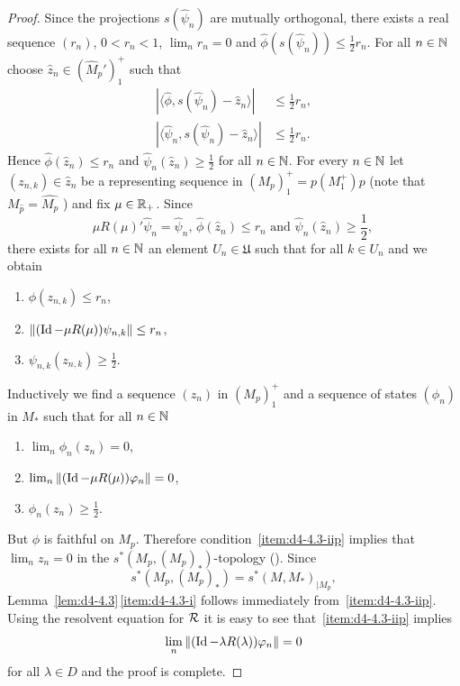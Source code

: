 \begin{proof}
Since the projections $ s(\widehat{\psi}_{n}) $  are mutually orthogonal, there exists a real sequence $ (r_{n}) $, $ 0 < r_{n} < 1 $, $ \lim_{n} r_{n} = 0 $  and $ \widehat{\phi}(s(\widehat{\psi}_{n})) \leq \frac{1}{2}r_{n} $.
For all $ n \in \mathbb{N} $  choose $ \hat{z}_{n} \in (\widehat{M}_{p}')_{1}^{+} $  such that
\begin{align*}
|\langle\widehat{\phi},s(\widehat{\psi}_{n}) - \hat{z}_{n}\rangle| &\leq \frac{1}{2}r_{n}, \\
|\langle\widehat{\psi}_{n},s(\widehat{\psi}_{n}) - \hat{z}_{n}\rangle| &\leq \frac{1}{2}r_{n}.
\end{align*}
Hence $ \widehat{\phi}(\hat{z}_{n}) \leq r_{n} $  and $ \widehat{\psi}_{n}(\hat{z}_{n}) \geq \frac{1}{2} $  for all $ n \in \mathbb{N} $.
For every $ n \in \mathbb{N} $  let $ (z_{n,k}) \in \hat{z}_{n} $  be a representing sequence in $ (M_{p})_{1}^{+} = p(M_{1}^{+})p $  (note that $ {M}_{\widehat{p}} = \widehat{M_{p}} $ ) and fix $ \mu \in \mathbb{R}_{+} $.
Since 
\[
\text{$\mu R(\mu)'\widehat{\psi}_{n} = \widehat{\psi}_{n}$, 
$\widehat{\phi}(\hat{z}_{n}) \leq r_{n}$ and 
$\widehat{\psi}_{n}(\hat{z}_{n}) \geq \frac{1}{2}$, }
\]
there exists for all $ n \in \mathbb{N} $  an element $ U_{n} \in \mathfrak{U} $  such that for all $ k \in U_{n} $ and we obtain
\begin{enumerate}[label=(\roman*$^{\prime}$), wide, labelindent=3em]
\item
$ \phi(z_{n,k}) \leq r_{n} $,

\item
$ \|(\Id - \mu R(\mu))\psi_{n,k}\| \leq r_{n} $,

\item
$ \psi_{n,k}(z_{n,k}) \geq \frac{1}{2} $. 
\end{enumerate}
Inductively we find a sequence $ (z_{n}) $  in $ (M_{p})_{1}^{+} $  and a sequence of states $ (\phi_{n}) $  in $ M_{*} $  such that for all $ n \in \mathbb{N} $ 
\begin{enumerate}[label=(\roman*$^{\prime\prime}$), wide, labelindent=3em]
\item
$ \lim_{n} \phi_{n}(z_{n}) = 0 $, 

\item\label{item:d4-4.3-iip}
$ \lim_{n} \|(\Id - \mu R(\mu))\phi_{n}\| = 0 $, 

\item
$ \phi_{n}(z_{n}) \geq \frac{1}{2} $.
\end{enumerate}
But $ \phi $  is faithful on $ M_{p} $.
Therefore condition~\ref{item:d4-4.3-iip} implies that $ \lim_{n} z_{n} = 0 $  in the $ s^{*}(M_{p},(M_{p})_{*}) $-topology (\textcite[Proposition III.5.4]{takesaki:1979}).
Since 
%
\[
	s^{*}(M_{p},(M_{p})_{*}) = s^{*}(M,M_{*})_{\vert M_{p}} ,
\]
%
Lemma~\ref{lem:d4-4.3}\,\ref{item:d4-4.3-i} follows immediately from~\ref{item:d4-4.3-iip}.
Using the resolvent equation for $ \mathcal{R} $  it is easy to see that~\ref{item:d4-4.3-iip} implies
\[
\lim_{n} \|(\Id - \lambda R(\lambda))\phi_{n}\| = 0
\]
for all $ \lambda \in D $  and the proof is complete.
\end{proof}
